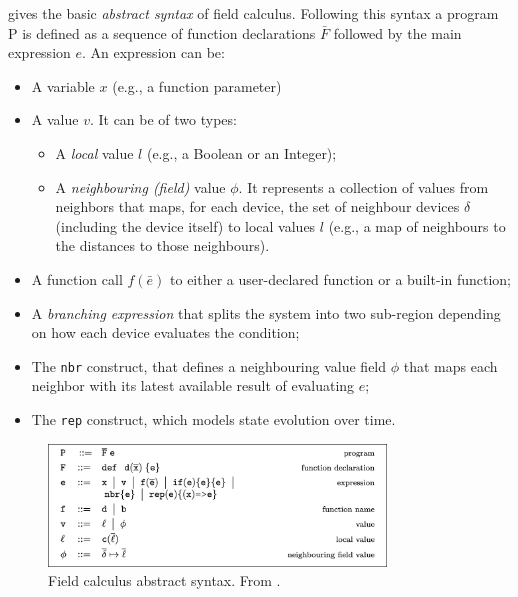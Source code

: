 \documentclass[12pt,a4paper,openright,twoside]{book}
\begin{document}
 gives the basic \emph{abstract syntax} of field calculus. Following this syntax 
    a program P is defined as a sequence of function declarations $\bar{F}$ followed by the main 
    expression $e$. An expression can be: 
    \begin{itemize}
        \item A variable $x$ (e.g., a function parameter)
        \item A value $v$. It can be of two types:
        \begin{itemize}
            \item A \emph{local} value $l$ (e.g., a Boolean or an Integer);
            \item A \emph{neighbouring (field)} value $\phi$. It represents a collection of values 
                from neighbors that maps, for each device, the set of neighbour devices $\delta$
                (including the device itself) to local values $l$ (e.g., a map of neighbours to the distances 
                to those neighbours).
        \end{itemize}
        \item A function call $f(\bar{e})$ to either a user-declared function or a built-in function;
        \item A \emph{branching expression} that splits the system into two sub-region depending on 
            how each device evaluates the condition;
        \item The \texttt{nbr} construct, that defines a neighbouring value field $\phi$ that maps 
            each neighbor with its latest available result of evaluating $e$;
        \item The \texttt{rep} construct, which models state evolution over time.
    \end{itemize}

    \begin{figure}[t]
        \centering
        \includegraphics[width=0.8\textwidth]{figures/FC-abstract-syntax.png}
        \caption{Field calculus abstract syntax. From \cite{viroli2016higher}.}
        \label{fig:fc-syntax}
    \end{figure}
\end{document}
